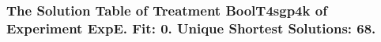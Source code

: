  \begin{frame}
 \fontsize{8pt}{9pt}\selectfont
 \frametitle{ The Solution Table of Treatment BoolT4sgp4k of Experiment ExpE. Fit: 0. Unique Shortest Solutions: 68. }

 \label{ExpESolutionTable002.tex}  
 \end{frame}

